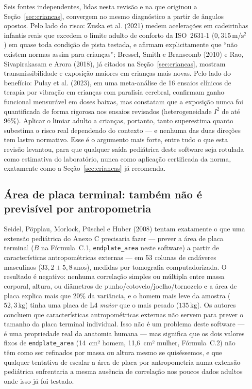 \documentclass[11pt,a4paper]{article}
\newcommand{\code}[1]{\texttt{\small #1}}
\newcommand{\unit}[2]{\ensuremath{#1\,\mathrm{#2}}}
\begin{document}
Seis fontes independentes, lidas nesta revisão e na que originou a
Seção~\ref{sec:criancas}, convergem no mesmo diagnóstico a partir de ângulos
opostos. Pelo lado do risco: Zuska et al. (2021) medem acelerações em
cadeirinhas infantis reais que excedem o limite adulto de conforto da
ISO~2631-1 (\unit{0{,}315}{m/s^2}) em quase toda condição de pista testada, e
afirmam explicitamente que ``não existem normas assim para crianças''; Bressel,
Smith e Branscomb (2010) e Rao, Sivapirakasam e Arora (2018), já citados na
Seção~\ref{sec:criancas}, mostram transmissibilidade e exposição maiores em
crianças mais novas. Pelo lado do benefício: Pulay et al. (2023), em uma
meta-análise de 16 ensaios clínicos de terapia por vibração em crianças com
paralisia cerebral, confirmam ganho funcional mensurável em doses baixas, mas
constatam que a exposição nunca foi quantificada de forma rigorosa nos ensaios
revisados (heterogeneidade $I^2$ de até 96\%). Aplicar o limiar adulto a
crianças, portanto, tanto superestima quanto subestima o risco real dependendo
do contexto --- e nenhuma das duas direções tem lastro normativo. Esse é o
argumento mais forte, entre tudo o que esta revisão levantou, para que
qualquer saída pediátrica deste software seja rotulada como estimativa do
laboratório, nunca como aplicação certificada da norma, exatamente como a
Seção~\ref{sec:criancas} já recomenda.

\subsection{Área de placa terminal: também não é previsível por antropometria}

Seidel, Pöpplau, Morlock, Püschel e Huber (2008) tentam exatamente o que uma
extensão pediátrica do Anexo C precisaria fazer --- prever a área de placa
terminal ($B$ na Fórmula~C.1, \code{endplate\_area} neste software) a partir de
características antropométricas externas --- em 53 colunas de cadáveres
masculinos (\unit{33{,}2 \pm 5{,}8}{anos}), medidas por tomografia
computadorizada. O resultado é negativo: nenhuma correlação simples ou múltipla
entre massa corporal, altura, ou diâmetros de punho/cotovelo/joelho/tornozelo e
a área de placa explica mais que 20\% da variância, e o homem mais leve da
amostra (\unit{52{,}3}{kg}) tinha uma placa de L4 \emph{maior} que o mais pesado
(\unit{135}{kg}). Os autores concluem que características antropométricas
externas não servem para prever o tamanho da placa terminal individual. Isso
não é um problema deste software --- é uma propriedade real da anatomia
humana --- mas significa que os dois valores fixos de \code{endplate\_area}
(14~cm² homem, 11,6~cm² mulher, Fórmula~C.2) não têm como ser refinados por
massa ou altura mesmo se quiséssemos, e que qualquer tentativa de escalar a
área de placa por antropometria numa extensão pediátrica enfrentaria a mesma
ausência de correlação nos poucos dados adultos onde isso já foi testado.
\end{document}
